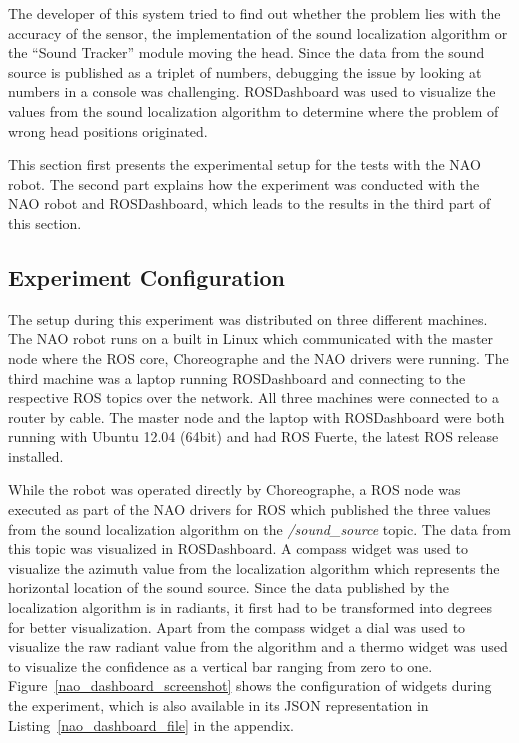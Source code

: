 The developer of this system tried to find out whether the problem lies with the accuracy of the sensor, the implementation of the sound localization algorithm or the ``Sound Tracker'' module moving the head. Since the data from the sound source is published as a triplet of numbers, debugging the issue by looking at numbers in a console was challenging. ROSDashboard was used to visualize the values from the sound localization algorithm to determine where the problem of wrong head positions originated.

This section first presents the experimental setup for the tests with the NAO robot. The second part explains how the experiment was conducted with the NAO robot and ROSDashboard, which leads to the results in the third part of this section.

\subsection{Experiment Configuration}
The setup during this experiment was distributed on three different machines. The NAO robot runs on a built in Linux which communicated with the master node where the ROS core, Choreographe and the NAO drivers were running. The third machine was a laptop running ROSDashboard and connecting to the respective ROS topics over the network. All three machines were connected to a router by cable. The master node and the laptop with ROSDashboard were both running with Ubuntu 12.04 (64bit) and had ROS Fuerte, the latest ROS release installed.

While the robot was operated directly by Choreographe, a ROS node was executed as part of the NAO drivers for ROS which published the three values from the sound localization algorithm on the \emph{/sound\_source} topic. The data from this topic was visualized in ROSDashboard. A compass widget was used to visualize the azimuth value from the localization algorithm which represents the horizontal location of the sound source. Since the data published by the localization algorithm is in radiants, it first had to be transformed into degrees for better visualization. Apart from the compass widget a dial was used to visualize the raw radiant value from the algorithm and a thermo widget was used to visualize the confidence as a vertical bar ranging from zero to one. Figure~\ref{nao_dashboard_screenshot} shows the configuration of widgets during the experiment, which is also available in its JSON representation in Listing~\ref{nao_dashboard_file} in the appendix.

